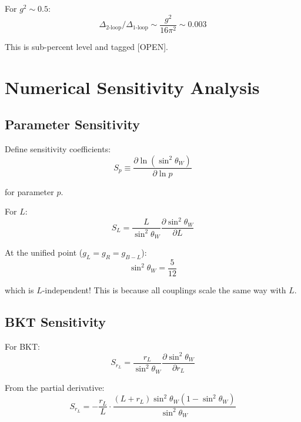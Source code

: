 \documentclass[11pt,a4paper]{article}
\begin{document}
For $g^2 \sim 0.5$:
\begin{equation}
\label{eq:two-loop-size}
\Delta_{\text{2-loop}}/\Delta_{\text{1-loop}} \sim \frac{g^2}{16\pi^2} \sim 0.003
\end{equation}

This is sub-percent level and tagged [OPEN].

\section{Numerical Sensitivity Analysis}
\label{sec:sensitivity}

\subsection{Parameter Sensitivity}
\label{subsec:param-sensitivity}

Define sensitivity coefficients:
\begin{equation}
\label{eq:sensitivity-def}
S_p \equiv \frac{\partial\ln(\sin^2\theta_W)}{\partial\ln p}
\end{equation}

for parameter $p$.

For $L$:
\begin{equation}
\label{eq:sensitivity-L}
S_L = \frac{L}{\sin^2\theta_W}\frac{\partial\sin^2\theta_W}{\partial L}
\end{equation}

At the unified point ($g_L = g_R = g_{B-L}$):
\begin{equation}
\label{eq:sin2-at-unified}
\sin^2\theta_W = \frac{5}{12}
\end{equation}

which is $L$-independent! This is because all couplings scale the same way with $L$.

\subsection{BKT Sensitivity}
\label{subsec:bkt-sensitivity-analysis}

For BKT:
\begin{equation}
\label{eq:bkt-sens-L}
S_{r_L} = \frac{r_L}{\sin^2\theta_W}\frac{\partial\sin^2\theta_W}{\partial r_L}
\end{equation}

From the partial derivative:
\begin{equation}
\label{eq:bkt-sens-value}
S_{r_L} = -\frac{r_L}{L}\cdot\frac{(L+r_L)\sin^2\theta_W(1-\sin^2\theta_W)}{\sin^2\theta_W}
\end{equation}
\end{document}
